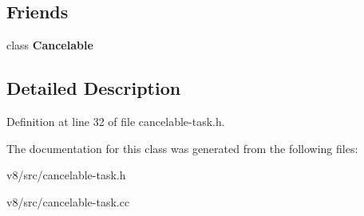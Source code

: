 \subsection*{Friends}
\begin{DoxyCompactItemize}
\item 
\mbox{\label{classv8_1_1internal_1_1CancelableTaskManager_a9c1763d9d6c045212734b3087ea842ad}} 
class {\bfseries Cancelable}
\end{DoxyCompactItemize}


\subsection{Detailed Description}


Definition at line 32 of file cancelable-\/task.\+h.



The documentation for this class was generated from the following files\+:\begin{DoxyCompactItemize}
\item 
v8/src/cancelable-\/task.\+h\item 
v8/src/cancelable-\/task.\+cc\end{DoxyCompactItemize}
